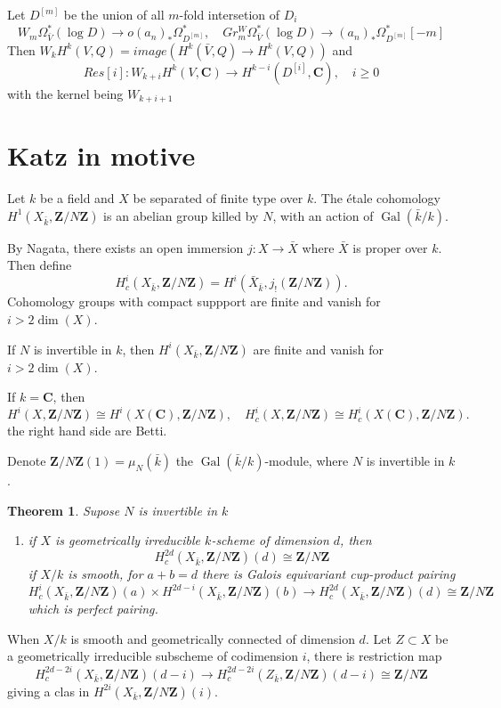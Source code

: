 \documentclass[leqno]{amsart}
\newcommand{\Z}{{\mathbf{Z}}}
\newcommand{\C}{\mathbf C}
\DeclareMathOperator{\Gal}{Gal}
\newcommand{\1}{\mathbf{1}}
\newtheorem{thm}{Theorem}[section]
\theoremstyle{definition}
\theoremstyle{remark}
\begin{document}
Let $D^{[m]}$ be the union of all $m$-fold
intersetion of  $D_i$
 \[
	 W_m\Omega_{\bar{V}}^*(\log D)
	 \to o
	 (a_n)_*\Omega_{D^{[m]}}^*,\quad
	 Gr^W_m \Omega_{\bar{V}}^*(\log D) \to 
	 (a_n)_*\Omega_{D^{[m]}}^*[-m]
\]
Then
$W_kH^k(V,Q)=image(
H^k(\bar{V},Q)\to H^k(V,Q))$
and 
\[
	Res[i]\colon 
	W_{k+i} H^k(V,\C)\to 
	H^{k-i}(D^{[i]},\C),\quad i\geq0
\]
with the kernel being $W_{k+i+1}$

\section{Katz in motive}

Let $k$ be a field and
$X$ be separated of finite type over  $k$.
The  \'{e}tale cohomology 
$H^1(X_{\bar{k}}, \Z/N\Z)$ is an abelian group 
killed by $N$, with an action of  $\Gal(\bar{k}/k)$.

By Nagata, there exists an open immersion
$j\colon X\to \bar{X}$
where $ \bar{X}$ is proper over  $k$.
Then define
 \[
	 H^i_c(X_{\bar{k}},\Z/N\Z)=
	 H^i(\bar{X}_{\bar{k}},j_!(\Z/N\Z)).
\]
Cohomology groups with compact suppport
are finite and vanish for $i>2\dim(X)$.

If  $N$ is invertible in  $k$,
then  $H^i(X_{\bar{k}},\Z/N\Z)$
are finite and vanish for $i>2\dim(X)$.

If  $k=\C$, then
 \[
	 H^i(X,\Z/N\Z)\cong H^i(X(\C),\Z/N\Z),\quad
	 H^i_c(X,\Z/N\Z)\cong H^i_c(X(\C),\Z/N\Z).
\]
the right hand side are Betti.

Denote $\Z/N\Z(1)=\mu_N(\bar{k})$
the $\Gal(\bar{k}/k)$-module,
where $N$ is invertible in  $k$.

 \begin{thm}
	Supose $N$ is invertible in  $k$
	 \begin{enumerate}[label=(\alph*)]
		\item if $X$ is geometrically irreducible 
			 $k$-scheme of dimension  $d$,
			 then
			  \[
				  H^{2d}_c(X_{\bar{k}},\Z/N\Z)(d)
				  \cong \Z/N\Z
			 \]
			 if $X/k$ is smooth, for  $a+b=d$
			 there is Galois equivariant 
			 cup-product pairing 
			  \[
				  H^i_c(X_{\bar{k}},\Z/N\Z)(a)
				  \times
				  H^{2d-i}(X_{\bar{k}},\Z/N\Z)(b)
				  \to 
				  H^{2d}_c(X_{\bar{k}},\Z/N\Z)(d)
				  \cong \Z/N\Z
			 \]
			 which is perfect pairing.
	\end{enumerate}
\end{thm}

When $X/k$ is smooth and geometrically connected of dimension  $d$.
Let  $Z\subset X$ be a 
geometrically irreducible subscheme of codimension  $i$,
there is restriction map
 \[
	 H^{2d-2i}_c(X_{\bar{k}},\Z/N\Z)(d-i)\to
	 H^{2d-2i}_c(Z_{\bar{k}},\Z/N\Z)(d-i)\cong \Z/N\Z
\]
giving a clas in $H^{2i}(X_{\bar{k}},\Z/N\Z)(i)$.
\end{document}
